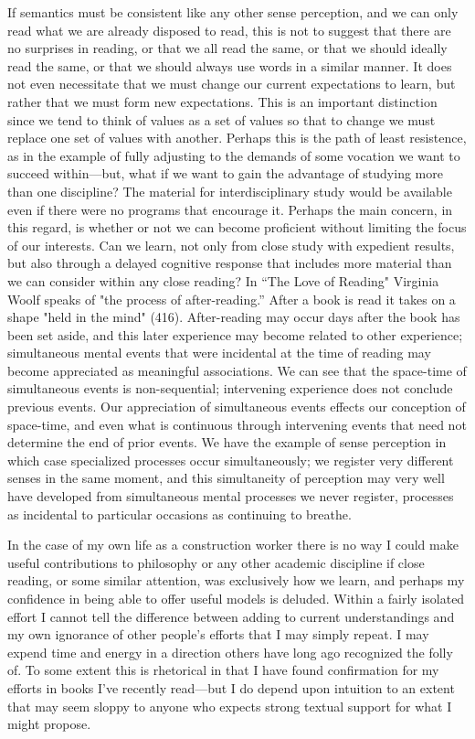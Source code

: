 \documentclass[
]{memoir}
\begin{document}
If semantics must be consistent like any other sense perception, and we
can only read what we are already disposed to read, this is not to
suggest that there are no surprises in reading, or that we all read the
same, or that we should ideally read the same, or that we should always
use words in a similar manner. It does not even necessitate that we must
change our current expectations to learn, but rather that we must form
new expectations. This is an important distinction since we tend to
think of values as a set of values so that to change we must replace one
set of values with another. Perhaps this is the path of least
resistence, as in the example of fully adjusting to the demands of some
vocation we want to succeed within---but, what if we want to gain the
advantage of studying more than one discipline? The material for
interdisciplinary study would be available even if there were no
programs that encourage it. Perhaps the main concern, in this regard, is
whether or not we can become proficient without limiting the focus of
our interests. Can we learn, not only from close study with expedient
results, but also through a delayed cognitive response that includes
more material than we can consider within any close reading? In ``The
Love of Reading" Virginia Woolf speaks of "the process of
after-reading.'' After a book is read it takes on a shape "held in the
mind" (416). After-reading may occur days after the book has been set
aside, and this later experience may become related to other experience;
simultaneous mental events that were incidental at the time of reading
may become appreciated as meaningful associations. We can see that the
space-time of simultaneous events is non-sequential; intervening
experience does not conclude previous events. Our appreciation of
simultaneous events effects our conception of space-time, and even what
is continuous through intervening events that need not determine the end
of prior events. We have the example of sense perception in which case
specialized processes occur simultaneously; we register very different
senses in the same moment, and this simultaneity of perception may very
well have developed from simultaneous mental processes we never
register, processes as incidental to particular occasions as continuing
to breathe.

In the case of my own life as a construction worker there is no way I
could make useful contributions to philosophy or any other academic
discipline if close reading, or some similar attention, was exclusively
how we learn, and perhaps my confidence in being able to offer useful
models is deluded. Within a fairly isolated effort I cannot tell the
difference between adding to current understandings and my own ignorance
of other people's efforts that I may simply repeat. I may expend time
and energy in a direction others have long ago recognized the folly of.
To some extent this is rhetorical in that I have found confirmation for
my efforts in books I've recently read---but I do depend upon intuition
to an extent that may seem sloppy to anyone who expects strong textual
support for what I might propose.
\end{document}
